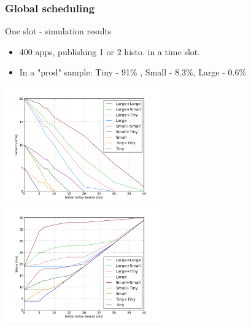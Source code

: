 \documentclass[]{prezentare}
\begin{document}

\begin{frame}
	\frametitle{Global scheduling}
	\begin{block}{One slot - simulation results}
	
	\begin{itemize}
	\item 400 apps, publishing 1 or 2 histo. in a time slot.
	\item In a "prod" sample: Tiny - 91\% , Small - 8.3\%, Large - 0.6\%
	\end{itemize}

	\vspace{-5mm}

	\begin{center}
	\includegraphics[width=0.5\textwidth]{../Images/one_slot_sim_latency}
	\includegraphics[width=0.5\textwidth]{../Images/one_slot_sim_skew}
	\end{center}
	\end{block}
\end{frame}
\end{document}
